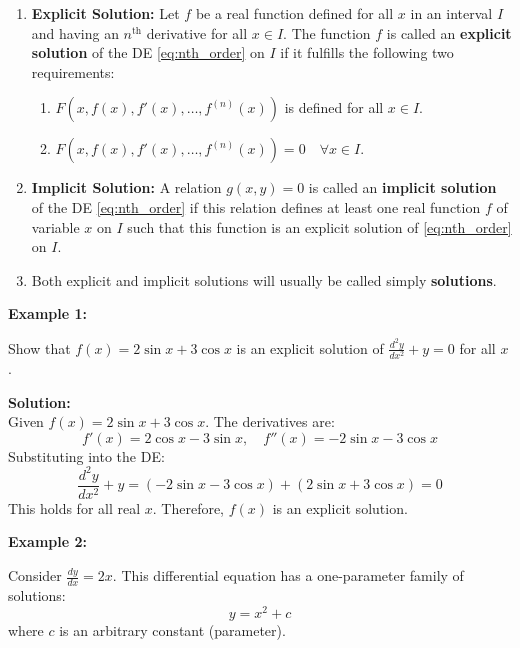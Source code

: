 \documentclass[11pt,a4paper]{article}
\newcommand{\Heading}[1]{\vspace{0.3cm}\noindent\textbf{\textcolor{AcademicGreen}{\large #1}}\par\vspace{0.15cm}}
\begin{document}
\vspace{0.2cm}
\begin{enumerate}[label=\textbf{\arabic*.}]
    \item \textbf{Explicit Solution:} Let $f$ be a real function defined for all $x$ in an interval $I$ and having an $n^{\text{th}}$ derivative for all $x \in I$. The function $f$ is called an \textbf{explicit solution} of the DE \eqref{eq:nth_order} on $I$ if it fulfills the following two requirements:
    \begin{enumerate}[label=\roman*)]
        \item $F\left(x, f(x), f'(x), \ldots, f^{(n)}(x)\right)$ is defined for all $x \in I$.
        \item $F\left(x, f(x), f'(x), \ldots, f^{(n)}(x)\right) = 0 \quad \forall x \in I$.
    \end{enumerate}

    \vspace{0.3cm}
    \item \textbf{Implicit Solution:} A relation $g(x,y) = 0$ is called an \textbf{implicit solution} of the DE \eqref{eq:nth_order} if this relation defines at least one real function $f$ of variable $x$ on $I$ such that this function is an explicit solution of \eqref{eq:nth_order} on $I$.
    \item Both explicit and implicit solutions will usually be called simply \textbf{solutions}.
\end{enumerate}

\Heading{Example 1:}
Show that $f(x) = 2\sin x + 3\cos x$ is an explicit solution of $\frac{d^2y}{dx^2} + y = 0$ for all $x$.

\noindent\textbf{Solution:} \\
Given $f(x) = 2\sin x + 3\cos x$. The derivatives are:
\[ f'(x) = 2\cos x - 3\sin x, \quad f''(x) = -2\sin x - 3\cos x \]
Substituting into the DE:
\[ \frac{d^2y}{dx^2} + y = (-2\sin x - 3\cos x) + (2\sin x + 3\cos x) = 0 \]
This holds for all real $x$. Therefore, $f(x)$ is an explicit solution.

\Heading{Example 2:}
Consider $\frac{dy}{dx} = 2x$. This differential equation has a one-parameter family of solutions:
\[ y = x^2 + c \]
where $c$ is an arbitrary constant (parameter).

\begin{center}
\end{center}
\end{document}
